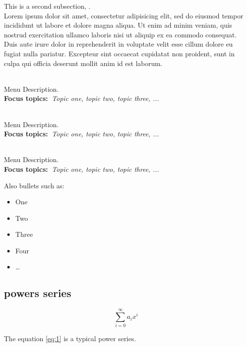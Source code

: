 \documentclass[a4paper, oneside]{report}
\begin{document}
  This is a second subsection\cite{gen1972}, \cite{schaeffer99}. ~\\
  Lorem ipsum dolor sit amet, consectetur adipisicing elit, sed do eiusmod
  tempor incididunt ut labore et dolore magna aliqua. Ut enim ad minim veniam,
  quis nostrud exercitation ullamco laboris nisi ut aliquip ex ea commodo
  consequat. Duis aute irure dolor in reprehenderit in voluptate velit esse
  cillum dolore eu fugiat nulla pariatur. Excepteur sint occaecat cupidatat non
  proident, sunt in culpa qui officia deserunt mollit anim id est laborum.

  \begin{description}\addtolength{\itemsep}{-0.35\baselineskip}%
    \item[\textbullet~\bfseries Menu Item] \hfill \\%
      Menu Description.~\\%
      {\textbf{Focus topics:~}\emph{Topic one, topic two, topic three, ...}}%
    \item[\textbullet~\bfseries Menu Item] \hfill \\%
      Menu Description.~\\%
      {\textbf{Focus topics:~}\emph{Topic one, topic two, topic three, ...}}%
    \item[\textbullet~\bfseries Menu Item] \hfill \\%
      Menu Description.~\\%
      {\textbf{Focus topics:~}\emph{Topic one, topic two, topic three, ...}}%
  \end{description}

  Also bullets such as:%
  \begin{itemize}\addtolength{\itemsep}{-0.35\baselineskip}%
    \item One%
    \item Two%
    \item Three%
    \item Four%
    \item \ldots%
  \end{itemize}%
\subsection{powers series} \label{subsection}

\begin{equation} \label{eq:1}
\sum_{i=0}^{\infty} a_i x^i
\end{equation}

The equation \ref{eq:1} is a typical power series.
\end{document}
